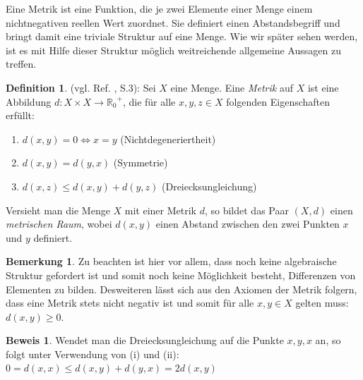 \documentclass[10pt,a4paper]{article}
\theoremstyle{plain}
\theoremstyle{definition}
\newtheorem{definition}[satz]{Definition}
\newenvironment{dfi}{\begin{shaded}\begin{definition}}{\end{definition}\end{shaded}}
\theoremstyle{nonumberplain}
\newtheorem{bemerkung}{Bemerkung}
\newenvironment{bem}{\begin{bemerkung}}{\end{bemerkung}}
\newtheorem{beweis}{Beweis}
\newenvironment{bew}{\begin{beweis}}{\end{beweis}}
\newcommand{\R}{\mathbb{R}}
\begin{document}
Eine Metrik ist eine Funktion, die je zwei Elemente einer Menge einem nichtnegativen reellen Wert zuordnet. Sie definiert einen Abstandsbegriff und bringt damit eine triviale Struktur auf eine Menge. Wie wir später sehen werden, ist es mit Hilfe dieser Struktur möglich weitreichende allgemeine Aussagen zu treffen.
\label{metrik}
\begin{dfi}
(vgl. Ref. \cite{Forster}, S.3): Sei $X$ eine Menge.  Eine \textit{Metrik} auf $X$ ist eine Abbildung $d : X \times X \rightarrow {\R_0}^+$, die für alle $x, y, z \in X$ folgenden Eigenschaften erfüllt:
\begin{enumerate}[label=(\roman*)]
\item $d(x, y) = 0 \Leftrightarrow x = y$ (Nichtdegeneriertheit)
\item $d(x, y) = d(y, x)$ (Symmetrie)
\item $d(x, z) \leq d(x, y) + d(y, z)$ (Dreiecksungleichung)
\end{enumerate}
Versieht man die Menge $X$ mit einer Metrik $d$, so bildet das Paar $(X, d)$ einen \textit{metrischen Raum}, wobei $d(x,y)$ einen Abstand zwischen den zwei Punkten $x$ und $y$ definiert.
\end{dfi}
\begin{bem}
Zu beachten ist hier vor allem, dass noch keine algebraische Struktur gefordert ist und somit noch keine Möglichkeit besteht, Differenzen von Elementen zu bilden. Desweiteren lässt sich aus den Axiomen der Metrik folgern, dass eine Metrik stets nicht negativ ist und somit für alle $x,y \in X$ gelten muss: $d(x,y) \geq 0$.
\end{bem}
\begin{bew}
Wendet man die Dreiecksungleichung auf die Punkte $x, y, x$ an, so folgt unter Verwendung von (i) und (ii):  $0 = d(x, x) \leq d(x, y) + d(y, x) = 2d(x, y)$
\end{bew}
\end{document}
